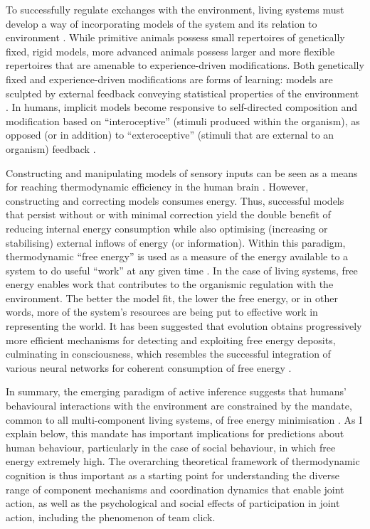 \begin{CJK}{UTF8}{gbsn}
To successfully regulate exchanges with the environment, living systems must develop a way of incorporating models of the system and its relation to environment \citep{Conant1970}.  While primitive animals possess small repertoires of genetically fixed, rigid models, more advanced animals possess larger and more flexible repertoires that are amenable to experience-driven modifications.  Both genetically fixed and experience-driven modifications are forms of learning: models are sculpted by external feedback conveying statistical properties of the environment \citep{Yufik2013}.  In humans, implicit models become responsive to self-directed composition and modification based on ``interoceptive'' (stimuli produced within the organism), as opposed (or in addition) to ``exteroceptive'' (stimuli that are external to an organism) feedback \citep{Yufik1998}.

Constructing and manipulating models of sensory inputs can be seen as a means for reaching thermodynamic efficiency in the human brain \citep{Yufik2013}. However, constructing and correcting models consumes energy.  Thus, successful models that persist without or with minimal correction yield the double benefit of reducing internal energy consumption while also optimising (increasing or stabilising) external inflows of energy (or information).  Within this paradigm, thermodynamic ``free energy'' is used as a measure of the energy available to a system to do useful ``work'' at any given time \citep[and entropy is the long-term average of free energy, see][]{Stoner2000,Friston2013}.  In the case of living systems, free energy enables work that contributes to the organismic regulation with the environment. The better the model fit, the lower the free energy, or in other words, more of the system's resources are being put to effective work in representing the world.  It has been suggested that evolution obtains progressively more efficient mechanisms for detecting and exploiting free energy deposits, culminating in consciousness, which resembles the successful integration of various neural networks for coherent consumption of free energy \citep{Annila2016}.

In summary, the emerging paradigm of active inference suggests that humans' behavioural interactions with the environment are constrained by the mandate, common to all multi-component living systems, of free energy minimisation \citep{Friston2013}.  As I explain below, this mandate has important implications for predictions about human behaviour, particularly in the case of social behaviour, in which free energy extremely high.  The overarching theoretical framework of thermodynamic cognition is thus important as a starting point for understanding the diverse range of component mechanisms and coordination dynamics that enable joint action, as well as the psychological and social effects of participation in joint action, including the phenomenon of team click.


\end{CJK}
